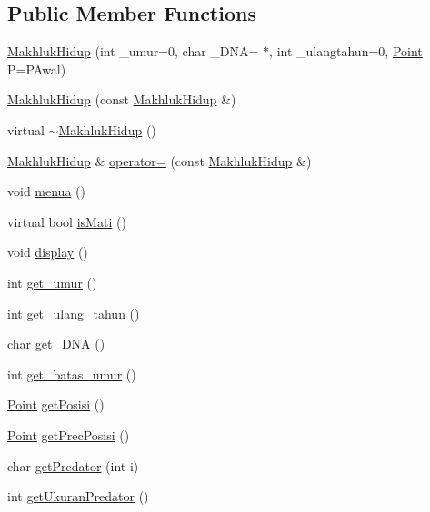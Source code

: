 \subsection*{Public Member Functions}
\begin{DoxyCompactItemize}
\item 
\hyperlink{class_makhluk_hidup_aa2b7d6507df43a37523592ae194cc30f}{Makhluk\+Hidup} (int \+\_\+umur=0, char \+\_\+\+D\+NA= \textquotesingle{}$\ast$\textquotesingle{}, int \+\_\+ulangtahun=0, \hyperlink{class_point}{Point} P=P\+Awal)
\item 
\hyperlink{class_makhluk_hidup_ab4caed894c2ae2ab388ce59b0b5311d9}{Makhluk\+Hidup} (const \hyperlink{class_makhluk_hidup}{Makhluk\+Hidup} \&)
\item 
virtual \hyperlink{class_makhluk_hidup_a4287f254bb19dc249032215f4a8ad82d}{$\sim$\+Makhluk\+Hidup} ()
\item 
\hyperlink{class_makhluk_hidup}{Makhluk\+Hidup} \& \hyperlink{class_makhluk_hidup_a372abdbd24705c1edd3661436947fe22}{operator=} (const \hyperlink{class_makhluk_hidup}{Makhluk\+Hidup} \&)
\item 
void \hyperlink{class_makhluk_hidup_ae06db2e59854f4cd51aae77ea177405e}{menua} ()
\item 
virtual bool \hyperlink{class_makhluk_hidup_a221406dd7a16071d7e74ef2e10b7fc4b}{is\+Mati} ()
\item 
void \hyperlink{class_makhluk_hidup_a5f680398fc4ad2f630b317695e9d4a4f}{display} ()
\item 
int \hyperlink{class_makhluk_hidup_a05e688885d0a194c53412ef8c8f04890}{get\+\_\+umur} ()
\item 
int \hyperlink{class_makhluk_hidup_a4077d7a2a0f0a84858b15dadd181d945}{get\+\_\+ulang\+\_\+tahun} ()
\item 
char \hyperlink{class_makhluk_hidup_a67f74ca50e81ff549d6b2c6a7cfcbba7}{get\+\_\+\+D\+NA} ()
\item 
int \hyperlink{class_makhluk_hidup_a78cd2c91aba52d11f2e7606b52a706d4}{get\+\_\+batas\+\_\+umur} ()
\item 
\hyperlink{class_point}{Point} \hyperlink{class_makhluk_hidup_a555874bb0b80f95157a7e2746ea36f35}{get\+Posisi} ()
\item 
\hyperlink{class_point}{Point} \hyperlink{class_makhluk_hidup_ace4363c8d92287af608d67e94a2f6c45}{get\+Prec\+Posisi} ()
\item 
char \hyperlink{class_makhluk_hidup_a97bc5cca37bfa18311e99ce63e39a009}{get\+Predator} (int i)
\item 
int \hyperlink{class_makhluk_hidup_ad12076a7c63dde29e90b1f4ca48aaff1}{get\+Ukuran\+Predator} ()

\end{DoxyCompactItemize}

